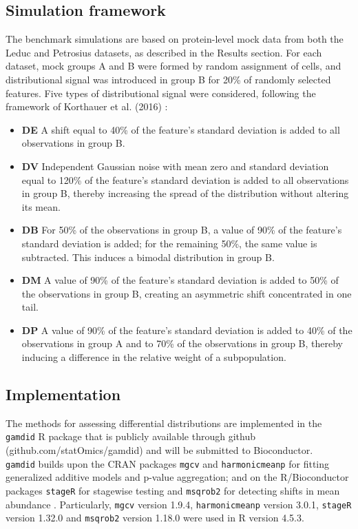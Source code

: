 \subsection{Simulation framework}
The benchmark simulations are based on protein-level mock data from both the Leduc and Petrosius datasets, as described in the Results section. For each dataset, mock groups A and B were formed by random assignment of cells, and distributional signal was introduced in group B for 20\% of randomly selected features. Five types of distributional signal were considered, following the framework of Korthauer et al. (2016) \cite{scdd}:
\begin{itemize}
    \item \textbf{DE} A shift equal to 40\% of the feature's standard deviation is added to all observations in group B.
    \item \textbf{DV} Independent Gaussian noise with mean zero and standard deviation equal to 120\% of the feature's standard deviation is added to all observations in group B, thereby increasing the spread of the distribution without altering its mean.
    \item \textbf{DB} For 50\% of the observations in group B, a value of 90\% of the feature's standard deviation is added; for the remaining 50\%, the same value is subtracted. This induces a bimodal distribution in group B.
    \item \textbf{DM} A value of 90\% of the feature's standard deviation is added to 50\% of the observations in group B, creating an asymmetric shift concentrated in one tail.
    \item \textbf{DP} A value of 90\% of the feature's standard deviation is added to 40\% of the observations in group A and to 70\% of the observations in group B, thereby inducing a difference in the relative weight of a subpopulation.
\end{itemize}


\subsection{Implementation}
The methods for assessing differential distributions are implemented in the \texttt{gamdid} R package that is publicly available through github (github.com/statOmics/gamdid) and will be submitted to Bioconductor.\\
\texttt{gamdid} builds upon the CRAN packages \texttt{mgcv} \cite{mgcv} and \texttt{harmonicmeanp} \cite{hmp_package} for fitting generalized additive models and p-value aggregation; and on the R/Bioconductor packages \texttt{stageR} \cite{stager} for stagewise testing and \texttt{msqrob2} for detecting shifts in mean abundance \cite{msqrob}. Particularly, \texttt{mgcv} version 1.9.4, \texttt{harmonicmeanp} version 3.0.1, \texttt{stageR} version 1.32.0 and \texttt{msqrob2} version 1.18.0 were used in R version 4.5.3.

